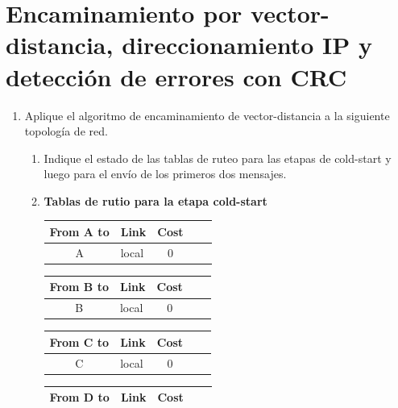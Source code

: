 \section*{Encaminamiento por vector-distancia, direccionamiento IP y detecci\'on de errores con CRC}

\begin{enumerate}
    \item Aplique el algoritmo de encaminamiento de vector-distancia a la siguiente topolog\'ia de red.
    \begin{enumerate}
        \item Indique el estado de las tablas de ruteo para las etapas de cold-start y luego para el env\'io de los primeros
        dos mensajes.
        \item[] \textbf{Tablas de rutio para la etapa cold-start}
        \begin{table}[H]
            \begin{tabular}{@{}clcll@{}}
                \toprule
                From A to            & \multicolumn{1}{c}{Link} & Cost                 \\ \midrule
                A                    & local                    & 0                    \\ \bottomrule
            \end{tabular}
            \hfill
            \begin{tabular}{@{}clcll@{}}
                \toprule
                From B to            & \multicolumn{1}{c}{Link} & Cost                 \\ \midrule
                B                    & local                    & 0                    \\ \bottomrule
            \end{tabular}
            \hfill
            \begin{tabular}{@{}clcll@{}}
                \toprule
                From C to            & \multicolumn{1}{c}{Link} & Cost                 \\ \midrule
                C                    & local                    & 0                    \\ \bottomrule
            \end{tabular}
        \end{table}
        \begin{table}[H]
            \begin{tabular}{@{}clcll@{}}
                \toprule
                From D to            & \multicolumn{1}{c}{Link} & Cost                 \\ \midrule

\end{tabular}
\end{table}
\end{enumerate}
\end{enumerate}
